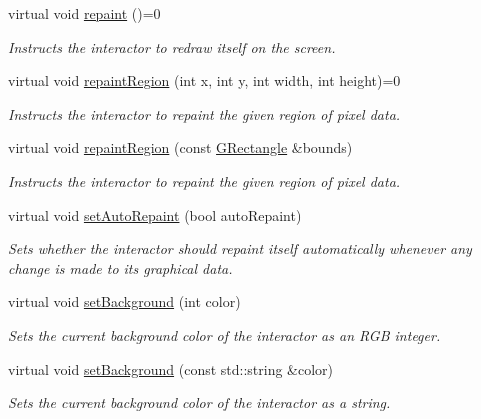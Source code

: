 \begin{DoxyCompactItemize}
virtual void \mbox{\hyperlink{classsgl_1_1GDrawingSurface_a4a8ae47b42f1e6a41b65d3546df46218}{repaint}} ()=0
\begin{DoxyCompactList}\small\item\em Instructs the interactor to redraw itself on the screen. \end{DoxyCompactList}\item 
virtual void \mbox{\hyperlink{classsgl_1_1GDrawingSurface_a1a3898317080fecf8af21bbeaeeb37c3}{repaint\+Region}} (int x, int y, int width, int height)=0
\begin{DoxyCompactList}\small\item\em Instructs the interactor to repaint the given region of pixel data. \end{DoxyCompactList}\item 
virtual void \mbox{\hyperlink{classsgl_1_1GDrawingSurface_a769c46fb3e1004aec76e8b0adfa42aa6}{repaint\+Region}} (const \mbox{\hyperlink{structsgl_1_1GRectangle}{G\+Rectangle}} \&bounds)
\begin{DoxyCompactList}\small\item\em Instructs the interactor to repaint the given region of pixel data. \end{DoxyCompactList}\item 
virtual void \mbox{\hyperlink{classsgl_1_1GDrawingSurface_adf10848319457bd6df4c657bf8872bee}{set\+Auto\+Repaint}} (bool auto\+Repaint)
\begin{DoxyCompactList}\small\item\em Sets whether the interactor should repaint itself automatically whenever any change is made to its graphical data. \end{DoxyCompactList}\item 
virtual void \mbox{\hyperlink{classsgl_1_1GDrawingSurface_aba673fd56570a074aba10fa059524b96}{set\+Background}} (int color)
\begin{DoxyCompactList}\small\item\em Sets the current background color of the interactor as an R\+GB integer. \end{DoxyCompactList}\item 
virtual void \mbox{\hyperlink{classsgl_1_1GDrawingSurface_ab4677ab2474e68b07aa56605af92a84a}{set\+Background}} (const std\+::string \&color)
\begin{DoxyCompactList}\small\item\em Sets the current background color of the interactor as a string. \end{DoxyCompactList}\item 

\end{DoxyCompactItemize}

